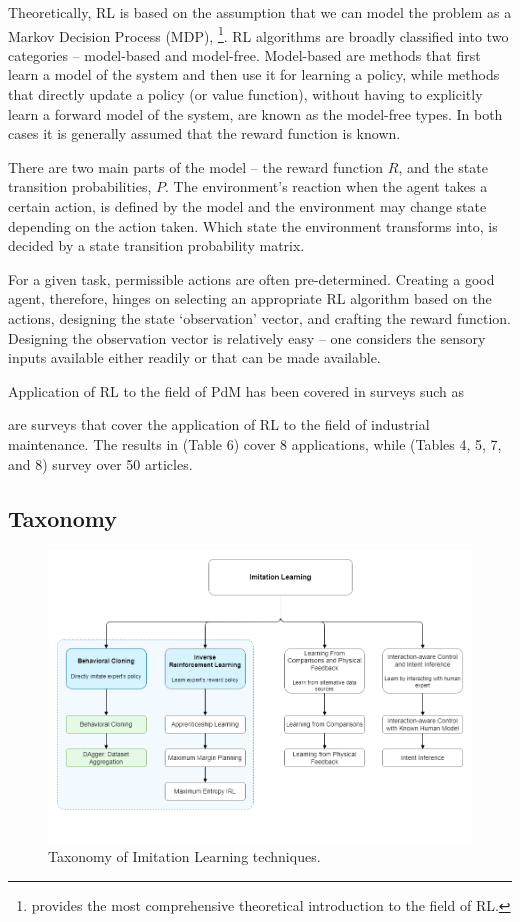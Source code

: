 \documentclass{article}
\begin{document}
	Theoretically, RL is based on the assumption that we can model the problem as a Markov Decision Process (MDP), \citep{sutton2018}\footnote{\citet{sutton2018} provides the most comprehensive theoretical introduction to the field of RL.}. 
	RL algorithms are broadly classified into two categories -- model-based and model-free. Model-based are methods that first learn a model of the system and then use it for learning a policy, while methods that directly update a policy (or value function), without having to explicitly learn a forward model of the system, are known as the model-free types. In both cases it is generally assumed that the reward function is known.
	
	There are two main parts of the model -- the reward function $R$, and the state transition probabilities, $P$. The environment's reaction when the agent takes a certain action, is defined by the model and the environment may change state depending on the action taken. Which state the environment transforms into, is decided by a state transition probability matrix. 
	
	For a given task, permissible actions are often pre-determined. Creating a good agent, therefore, hinges on selecting an appropriate RL algorithm based on the actions, designing the state `observation' vector, and crafting the reward function. Designing the observation vector is relatively easy -- one considers the sensory inputs available either readily or that can be made available. 
	
	Application of RL to the field of PdM has been covered in surveys such as \cite{Erhan2021Smart, Ren2021, Barja-Martinez2021, panzer2022, siraskar2023}
	
	\cite{panzer2022, siraskar2023} are surveys that cover the application of RL to the field of industrial maintenance. The results in \cite{panzer2022} (Table 6) cover 8 applications, while \cite{siraskar2023} (Tables 4, 5, 7, and 8) survey over 50 articles. 
	
	\subsection{Taxonomy}
	
	\begin{figure}[h]
		\centering
		\includegraphics[width=0.75\linewidth]{images/IRL_Taxonomy.png}
		\caption{Taxonomy of Imitation Learning techniques.}
		\label{fig:taxonomy}
	\end{figure}
	
\end{document}

